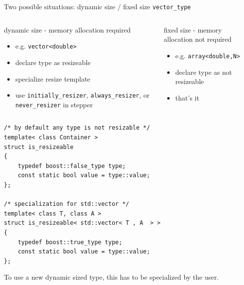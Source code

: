\begin{frame}[fragile]
Two possible situations: dynamic size / fixed size \lstinline+vector_type+
\vspace{0.5em}

\begin{columns}[t]

 \begin{column}{0.5\linewidth}
  \begin{block}{dynamic size - memory allocation required}
   \begin{itemize}
    \item e.g. \lstinline+vector<double>+
    \item declare type as resizeable
    \item specialize resize template
    \item use \lstinline+initially_resizer+, \lstinline+always_resizer+, or \lstinline+never_resizer+ in stepper
   \end{itemize}
  \end{block}
 \end{column}

 \begin{column}{0.5\linewidth}
  \begin{block}{fixed size - memory allocation not required}
   \begin{itemize}
    \item e.g. \lstinline+array<double,N>+
    \item declare type as not resizeable
    \item that's it
   \end{itemize}
  \end{block}
 \end{column}

\end{columns}

\end{frame}

\begin{frame}[fragile]

\begin{lstlisting}
/* by default any type is not resizable */
template< class Container >
struct is_resizeable
{
    typedef boost::false_type type;
    const static bool value = type::value;
};

/* specialization for std::vector */
template< class T, class A >
struct is_resizeable< std::vector< T , A  > >
{
    typedef boost::true_type type;
    const static bool value = type::value;
}; 
\end{lstlisting}
To use a new dynamic sized type, this has to be specialized by the user.
\end{frame}


